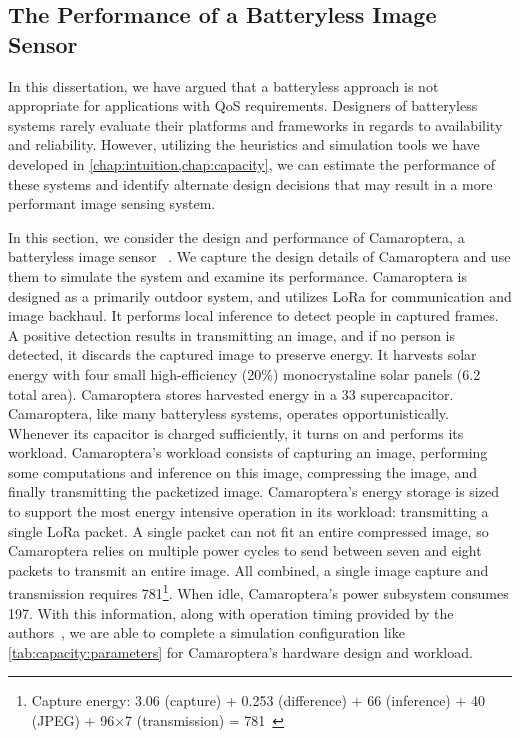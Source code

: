 \subsection{The Performance of a Batteryless Image Sensor}
In this dissertation, we have argued that a batteryless approach is not appropriate for applications with QoS requirements. Designers of batteryless systems rarely evaluate their platforms and frameworks in regards to availability and reliability. However, utilizing the heuristics and simulation tools we have developed in \cref{chap:intuition,chap:capacity}, we can estimate the performance of these systems and identify alternate design decisions that may result in a more performant image sensing system.

In this section, we consider the design and performance of Camaroptera, a batteryless image sensor
~\cite{nardello2019camaroptera,desai2022camaroptera}.
We capture the design details of Camaroptera and use them to simulate the system and examine its performance.
Camaroptera is designed as a primarily outdoor system, and utilizes LoRa for communication and image backhaul.
It performs local inference to detect people in captured frames. A positive detection results in transmitting an image, and if no person is detected, it discards the captured image to preserve energy. 
It harvests solar energy with four small high-efficiency (20\%) monocrystaline solar panels (6.2\ssi{\centi\meter\squared} total area).  Camaroptera stores harvested energy in a 33\ssi{\milli\farad} supercapacitor.
Camaroptera, like many batteryless systems, operates opportunistically. 
Whenever its capacitor is charged sufficiently, it turns on and  performs its workload. 
Camaroptera's workload consists of capturing an image, performing some computations and inference on this image, compressing the image, and finally transmitting the packetized image. 
Camaroptera's energy storage is sized to support the most energy intensive operation in its workload: transmitting a single LoRa packet.
A single packet can not fit an entire compressed image, so Camaroptera relies on multiple power cycles to send between seven and eight packets to transmit an entire image.
All combined, a single image capture and transmission requires 781\ssi{\milli\joule}\footnote{Capture energy: 3.06 (capture) + 0.253 (difference) + 66 (inference) + 40 (JPEG) + 96$\times$7 (transmission) = 781\ssi{\milli\joule}~\cite{desai2022camaroptera}}.
When idle, Camaroptera's power subsystem consumes 197\ssi{\micro\watt}.
With this information, along with operation timing provided by the authors~\cite{desai2022camaroptera}, we are able to complete a simulation configuration like \cref{tab:capacity:parameters} for Camaroptera's hardware design and workload.

